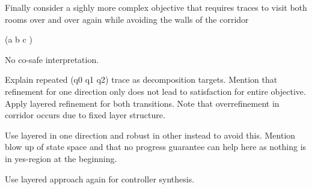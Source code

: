 \startsubsection[title={2-Recurrence and Safety}]


    Finally consider a sighly more complex objective that requires traces to visit both rooms over and over again while avoiding the walls of the corridor

    \startformula
        \Globally (\neg a \wedge \Finally b \wedge \Finally c )
    \stopformula

    No co-safe interpretation.

    Explain repeated (q0 q1 q2) trace as decomposition targets.
    Mention that refinement for one direction only does not lead to satisfaction for entire objective.
    Apply layered refinement for both transitions.
    Note that overrefinement in corridor occurs due to fixed layer structure.

    Use layered in one direction and robust in other instead to avoid this.
    Mention blow up of state space and that no progress guarantee can help here as nothing is in yes-region at the beginning.

    Use layered approach again for controller synthesis.

\stopsubsection

